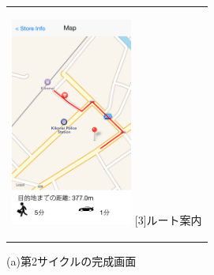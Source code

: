 \begin{figure}[htbp]
\begin{center}
\begin{tabular}{c}
      \begin{minipage}{0.33\hsize}
        \begin{center}
\includegraphics[width=4cm, bb=0 0 320 548]{5.4_route.png}
          \hspace{1cm} [3]ルート案内
        \end{center}
      \end{minipage}

    \end{tabular}
    \caption{(a)第2サイクルの完成画面}
    \label{fig:lena}
  \end{center}
\end{figure}

